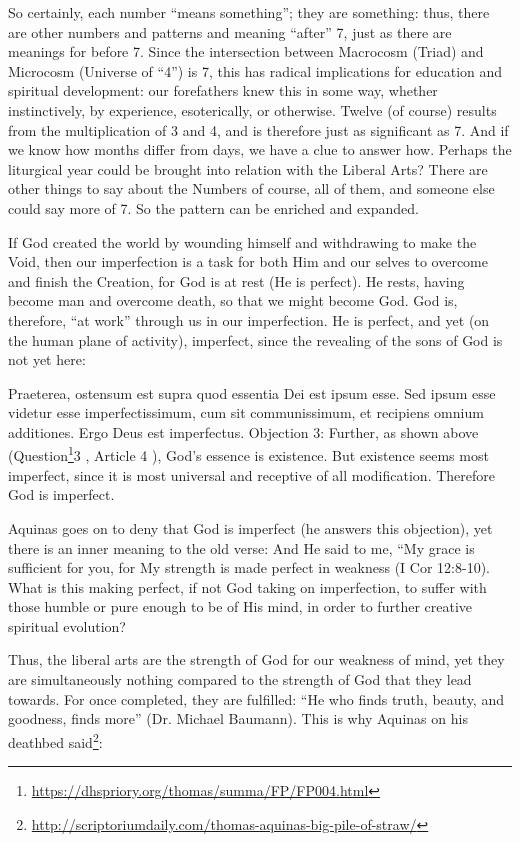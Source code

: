 So certainly, each number ``means something''; they are something: thus, there are other numbers and patterns and meaning ``after'' 7, just as there are meanings for before 7. Since the intersection between Macrocosm (Triad) and Microcosm (Universe of ``4'') is 7, this has radical implications for education and spiritual development: our forefathers knew this in some way, whether instinctively, by experience, esoterically, or otherwise. Twelve (of course) results from the multiplication of 3 and 4, and is therefore just as significant as 7. And if we know how months differ from days, we have a clue to answer how. Perhaps the liturgical year could be brought into relation with the Liberal Arts? There are other things to say about the Numbers of course, all of them, and someone else could say more of 7. So the pattern can be enriched and expanded.

If God created the world by wounding himself and withdrawing to make the Void, then our imperfection is a task for both Him and our selves to overcome and finish the Creation, for God is at rest (He is perfect). He rests, having become man and overcome death, so that we might become God. God is, therefore, ``at work'' through us in our imperfection. He is perfect, and yet (on the human plane of activity), imperfect, since the revealing of the sons of God is not yet here:

\begin{quotex}
Praeterea, ostensum est supra quod essentia Dei est ipsum esse. Sed ipsum esse videtur esse imperfectissimum, cum sit communissimum, et recipiens omnium additiones. Ergo Deus est imperfectus. Objection 3: Further, as shown above (Question\footnote{\url{https://dhspriory.org/thomas/summa/FP/FP004.html}}3 , Article 4 ), God's essence is existence. But existence seems most imperfect, since it is most universal and receptive of all modification. Therefore God is imperfect.
\end{quotex}


Aquinas goes on to deny that God is imperfect (he answers this objection), yet there is an inner meaning to the old verse: And He said to me, ``My grace is sufficient for you, for My strength is made perfect in weakness (I Cor 12:8-10). What is this making perfect, if not God taking on imperfection, to suffer with those humble or pure enough to be of His mind, in order to further creative spiritual evolution?

Thus, the liberal arts are the strength of God for our weakness of mind, yet they are simultaneously nothing compared to the strength of God that they lead towards. For once completed, they are fulfilled: ``He who finds truth, beauty, and goodness, finds more'' (Dr. Michael Baumann). This is why Aquinas on his deathbed said\footnote{\url{http://scriptoriumdaily.com/thomas-aquinas-big-pile-of-straw/}}:


